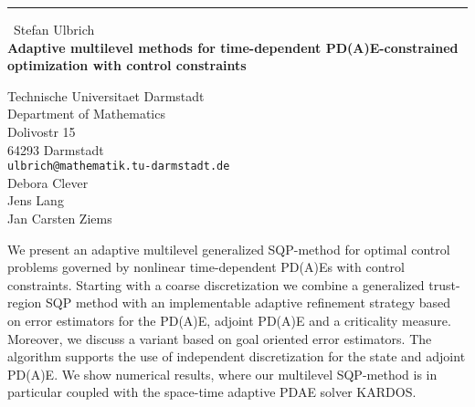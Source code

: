 \documentclass{report}
\begin{document}
\begin{center}
\rule{6in}{1pt} \
{\large Stefan Ulbrich \\
{\bf Adaptive multilevel methods for time-dependent PD(A)E-constrained optimization with control constraints}}

Technische Universitaet Darmstadt \\ Department of Mathematics \\ Dolivostr 15 \\ 64293 Darmstadt
\\
{\tt ulbrich@mathematik.tu-darmstadt.de}\\
Debora Clever\\
Jens Lang\\
Jan Carsten Ziems\end{center}

We present an adaptive multilevel generalized SQP-method for optimal
control problems governed by nonlinear time-dependent PD(A)Es with
control constraints. Starting with a coarse discretization we combine a
generalized trust-region SQP method with an implementable adaptive
refinement strategy based on error estimators for the PD(A)E, adjoint
PD(A)E and a criticality measure. Moreover, we discuss a variant based on
goal oriented error estimators. The algorithm supports the use of
independent discretization for the state and adjoint PD(A)E. We show
numerical results, where our multilevel SQP-method is in particular
coupled with the space-time adaptive PDAE solver KARDOS.
\end{document}
